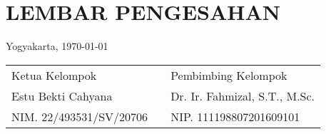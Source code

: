 \appendix
\chapter*{LEMBAR PENGESAHAN}
\begin{center}
  Yogyakarta, \today  
\end{center}

\begin{table}[h]
    \centering
    \begin{tabular}{p{5cm} p{2cm} p{6cm}}
        Ketua Kelompok &  & Pembimbing Kelompok\\[2.5cm]
        Estu Bekti Cahyana &  & Dr. Ir. Fahmizal, S.T., M.Sc.\\
        NIM. 22/493531/SV/20706 &  & NIP. 111198807201609101
    \end{tabular}
\end{table}
